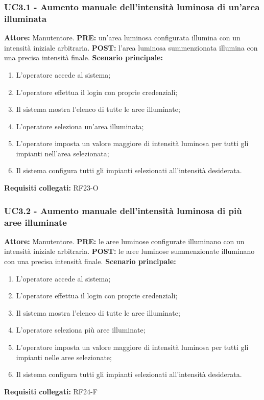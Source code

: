 \documentclass[a4paper, 12pt]{article}
\begin{document}
\subsubsection{UC3.1 - Aumento manuale dell'intensità luminosa di un'area illuminata}
\textbf{Attore:} Manutentore.\newline
\textbf{PRE:} un'area luminosa configurata illumina con un intensità iniziale arbitraria.\newline
\textbf{POST:} l'area luminosa summenzionata illumina con una precisa intensità finale.\newline
\textbf{Scenario principale:}
\begin{enumerate}
    \item L'operatore accede al sistema;
    \item L'operatore effettua il login con proprie credenziali;
    \item Il sistema mostra l'elenco di tutte le aree illuminate;
    \item L'operatore seleziona un'area illuminata;
    \item L'operatore imposta un valore maggiore di intensità luminosa per tutti gli impianti nell'area selezionata;
    \item Il sistema configura tutti gli impianti selezionati all'intensità desiderata.
\end{enumerate}
\textbf{Requisiti collegati:} RF23-O\newline

\subsubsection{UC3.2 - Aumento manuale dell'intensità luminosa di più aree illuminate}
\textbf{Attore:} Manutentore.\newline
\textbf{PRE:} le aree luminose configurate illuminano con un intensità iniziale arbitraria.\newline
\textbf{POST:} le aree luminose summenzionate illuminano con una precisa intensità finale.\newline
\textbf{Scenario principale:}
\begin{enumerate}
    \item L'operatore accede al sistema;
    \item L'operatore effettua il login con proprie credenziali;
    \item Il sistema mostra l'elenco di tutte le aree illuminate;
    \item L'operatore seleziona più aree illuminate;
    \item L'operatore imposta un valore maggiore di intensità luminosa per tutti gli impianti nelle aree selezionate;
    \item Il sistema configura tutti gli impianti selezionati all'intensità desiderata.
\end{enumerate}
\textbf{Requisiti collegati:} RF24-F\newline
\end{document}

